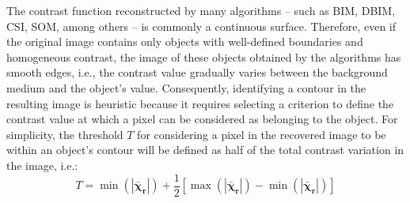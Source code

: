 \documentclass{IEEEtran}
\newcommand{\Xr}{\boldsymbol{\bar{\chi}_r}}
\begin{document}
			The contrast function reconstructed by many algorithms -- such as BIM, DBIM, CSI, SOM, among others -- is commonly a continuous surface. Therefore, even if the original image contains only objects with well-defined boundaries and homogeneous contrast, the image of these objects obtained by the algorithms has smooth edges, i.e., the contrast value gradually varies between the background medium and the object's value. Consequently, identifying a contour in the resulting image is heuristic because it requires selecting a criterion to define the contrast value at which a pixel can be considered as belonging to the object. For simplicity, the threshold $T$ for considering a pixel in the recovered image to be within an object's contour will be defined as half of the total contrast variation in the image, i.e.:
			\begin{equation}
				T = \min(|\Xr|) + \frac{1}{2} \left[\max(|\Xr|)-\min(|\Xr|)\right]
			\end{equation}
		
			
\end{document}
